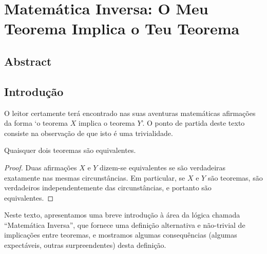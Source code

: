 
\chapter{Matemática Inversa: O Meu Teorema Implica o Teu Teorema}

\section*{Abstract}



\section*{Introdução}

O leitor certamente terá encontrado nas suas aventuras matemáticas afirmações da forma `o teorema $X$ implica o teorema $Y$'. O ponto de partida deste texto consiste na observação de que isto é uma trivialidade.

\begin{theorem}
Quaisquer dois teoremas são equivalentes.
\end{theorem}

\begin{proof}
Duas afirmações $X$ e $Y$ dizem-se equivalentes se são verdadeiras exatamente nas mesmas circunstâncias. Em particular, se $X$ e $Y$ são teoremas, são verdadeiros independentemente das circunstâncias, e portanto são equivalentes.
\end{proof}

Neste texto, apresentamos uma breve introdução à área da lógica chamada ``Matemática Inversa'', que fornece uma definição alternativa e não-trivial de implicações entre teoremas, e mostramos algumas consequências (algumas expectáveis, outras surpreendentes) desta definição.




